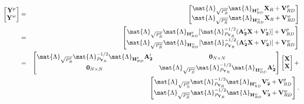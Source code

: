 \begin{eqnarray}
\begin{bmatrix} \mathbf{Y}^{p} \\ \mathbf{Y}^{w} \end{bmatrix} & = & \begin{bmatrix} \mat{\Lambda}_{\sqrt{P_{R}^{p}}} \mat{\Lambda}_{\mathbf{H}_{RD}^p} \mathbf{X}_{R} + \mathbf{V}_{RD}^{p} \\ \mat{\Lambda}_{\sqrt{P_{R}^{w}}} \mat{\Lambda}_{\mathbf{H}_{RD}^w} \mathbf{X}_{R} + \mathbf{V}_{RD}^{w} \end{bmatrix} \nonumber\\
& = & \begin{bmatrix} \mat{\Lambda}_{\sqrt{P_{R}^{p}}} \mat{\Lambda}_{\mathbf{H}_{RD}^p} [\mat{\Lambda}_{P_{\mathbf{Y}_{R}}}^{-1/2} (\mathbf{A'_2} \mathbf{X} + \mathbf{V'_2})] + \mathbf{V}_{RD}^{p} \\ \mat{\Lambda}_{\sqrt{P_{R}^{w}}} \mat{\Lambda}_{\mathbf{H}_{RD}^w} [\mat{\Lambda}_{P_{\mathbf{Y}_{R}}}^{-1/2} (\mathbf{A'_2} \mathbf{X} + \mathbf{V'_2})] + \mathbf{V}_{RD}^{w} \end{bmatrix} \nonumber\\
& = & \begin{bmatrix} \mat{\Lambda}_{\sqrt{P_{R}^{p}}} \mat{\Lambda}_{P_{\mathbf{Y}_{R}}}^{-1/2} \mat{\Lambda}_{\mathbf{H}_{RD}^p} \mathbf{A'_2} & \mathbf{0}_{N \times N} \\ \mathbf{0}_{N \times N} & \mat{\Lambda}_{\sqrt{P_{R}^{w}}} \mat{\Lambda}_{P_{\mathbf{Y}_{R}}}^{-1/2} \mat{\Lambda}_{\mathbf{H}_{RD}^w} \mathbf{A'_2} \end{bmatrix} \begin{bmatrix} \mathbf{X} \\ \mathbf{X} \end{bmatrix} + \nonumber\\
&  & \begin{bmatrix} \mat{\Lambda}_{\sqrt{P_{R}^{p}}} \mat{\Lambda}_{P_{\mathbf{Y}_{R}}}^{-1/2} \mat{\Lambda}_{\mathbf{H}_{RD}^p} \mathbf{V'_2} + \mathbf{V}_{RD}^{p} \\ \mat{\Lambda}_{\sqrt{P_{R}^{w}}} \mat{\Lambda}_{P_{\mathbf{Y}_{R}}}^{-1/2} \mat{\Lambda}_{\mathbf{H}_{RD}^w} \mathbf{V'_2} + \mathbf{V}_{RD}^{w} \end{bmatrix}.
\end{eqnarray}

